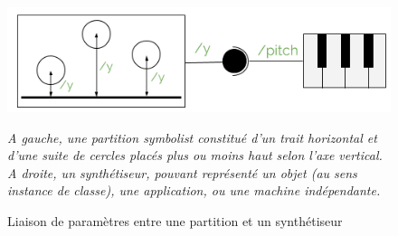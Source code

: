\begin{figure}[H]
	\centering
	\includegraphics[keepaspectratio=true, width=\textwidth]{ModeleDeNotation/i/linkingParameters.png}
	\caption{Liaison de paramètres entre une partition et un synthétiseur}
	\label{fig:linkingParameters}
	\small
	\textit{ A gauche, une partition \textit{symbolist} constitué d'un trait horizontal et d'une suite de cercles placés plus ou moins haut selon l'axe vertical. A droite, un synthétiseur, pouvant représenté un objet (au sens instance de classe), une application, ou une machine indépendante. }
\end{figure}

